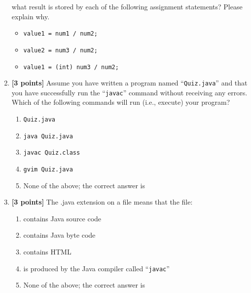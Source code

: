 \begin{enumerate}
 what result is stored by each of the following assignment statements? Please explain why.
 \begin{itemize}
 \item {\tt value1 = num1 / num2;}
 
\vspace{0.3in}
 \item {\tt value2 = num3 / num2;}
 
\vspace{0.3in}
 \item {\tt value1 = (int) num3 / num2;}
 
\vspace{0.3in}
 \end{itemize}


\item {\bf [3 points]}
Assume you have written a program named ``{\tt Quiz.java}'' and that you have 
successfully run the ``{\tt javac}'' command without receiving any  errors. 
Which of the following commands will run (i.e., execute) your program?
\begin{enumerate}
\item \verb$Quiz.java$

\medskip
\item \verb$java Quiz.java$

\medskip
\item \verb$javac Quiz.class$

\medskip 
\item \verb$gvim Quiz.java$

\medskip
\item None of the above; the correct answer is \underline{\hspace{3in}}
\end{enumerate}


\bigskip
\bigskip


\item {\bf [3 points]}
  The .java extension on a file means that the file:
  \begin{enumerate}
    \item contains Java source code
      \medskip 
    \item contains Java byte code
      \medskip
    \item contains HTML
      \medskip 
    \item is produced by the Java compiler called ``{\tt javac}''
      \medskip
    \item None of the above; the correct answer is \underline{\hspace{3in}}
  \end{enumerate}


\end{enumerate}
